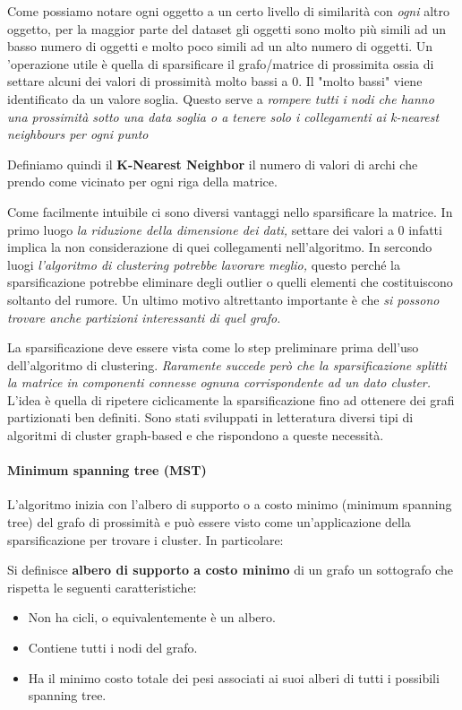 Come possiamo notare ogni oggetto a un certo livello di similarità con \textit{ogni} altro oggetto, per la maggior parte del dataset gli oggetti sono molto più simili ad un basso numero di oggetti e molto poco simili ad un alto numero di oggetti. Un 'operazione utile è quella di sparsificare il grafo/matrice di prossimita ossia di settare alcuni dei valori di prossimità molto bassi a 0. Il "molto bassi" viene identificato da un valore soglia. Questo serve a \textit{rompere tutti i nodi che hanno una prossimità sotto una data soglia o a tenere solo i collegamenti ai k-nearest neighbours per ogni punto}

\begin{defn}
	Definiamo quindi il \textbf{K-Nearest Neighbor} il numero di valori di archi che prendo come vicinato per ogni riga della matrice.
\end{defn}
Come facilmente intuibile ci sono diversi vantaggi nello sparsificare la matrice. In primo luogo \textit{la riduzione della dimensione dei dati,} settare dei valori a 0 infatti implica la non considerazione di quei collegamenti nell'algoritmo. In sercondo luogi \textit{ l'algoritmo di clustering potrebbe lavorare meglio,} questo perché la sparsificazione potrebbe eliminare degli outlier  o quelli elementi che costituiscono soltanto del rumore. Un ultimo motivo altrettanto importante è che \textit{si possono trovare anche partizioni interessanti di quel grafo.}

La sparsificazione deve essere vista come lo step preliminare prima dell'uso dell'algoritmo di clustering. \textit{Raramente succede però che la sparsificazione splitti la matrice in componenti connesse ognuna corrispondente ad un dato cluster.} L'idea è quella di ripetere ciclicamente la sparsificazione fino ad ottenere dei grafi partizionati ben definiti. Sono stati sviluppati in letteratura diversi tipi di algoritmi di cluster graph-based e che rispondono a queste necessità.

\paragraph{Minimum spanning tree (MST)} L'algoritmo inizia con l'albero di supporto o a costo minimo (minimum spanning tree) del grafo di prossimità e può essere visto come un'applicazione della sparsificazione per trovare i cluster. In particolare:
\begin{defn}
	Si definisce  \textbf{albero di supporto a costo minimo} di un grafo un sottografo che rispetta le seguenti caratteristiche:
	\begin{itemize}
		\item Non ha cicli, o equivalentemente è un albero.
		\item Contiene tutti i nodi del grafo.
		\item Ha il minimo costo totale dei pesi associati ai suoi alberi di tutti i possibili spanning tree.
	\end{itemize}
\end{defn}


